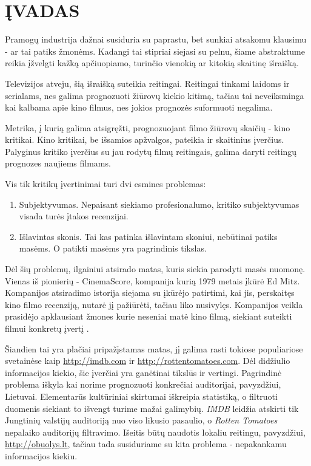 \chapter{ĮVADAS}

Pramogų industrija dažnai susiduria su paprastu, bet sunkiai atsakomu klausimu
- ar tai patiks žmonėms. Kadangi tai stipriai siejasi su pelnu, šiame abstraktume
reikia įžvelgti kažką apčiuopiamo, turinčio vienokią ar kitokią skaitinę išraišką.

Televizijos atveju, šią išraišką suteikia reitingai. Reitingai tinkami laidoms
ir serialams, nes galima prognozuoti žiūrovų kiekio kitimą, tačiau tai neveiksminga
kai kalbama apie kino filmus, nes jokios prognozės suformuoti negalima.

Metrika, į kurią galima atsigręžti, prognozuojant filmo žiūrovų skaičių - kino kritikai.
Kino kritikai, be išsamios apžvalgos, pateikia ir skaitinius įverčius. Palyginus
kritiko įverčius su jau rodytų filmų reitingais, galima daryti reitingų prognozes
naujiems filmams.

Vis tik kritikų įvertinimai turi dvi esmines problemas:
\begin{enumerate}
  \item Subjektyvumas. Nepaisant siekiamo profesionalumo, kritiko subjektyvumas
  visada turės įtakos recenzijai.
  \item Išlavintas skonis. Tai kas patinka išlavintam skoniui, nebūtinai patiks masėms.
  O patikti masėms yra pagrindinis tikslas.
\end{enumerate}

Dėl šių problemų, ilgainiui atsirado matas, kuris siekia parodyti masės nuomonę.
Vienas iš pionierių - CinemaScore, kompanija kurią 1979 metais įkūrė Ed Mitz.
Kompanijos atsiradimo istorija siejama su įkūrėjo patirtimi, kai jis, perskaitęs
kino filmo recenziją, nutarė jį pažiūrėti, tačiau liko nusivylęs. Kompanijos veikla
prasidėjo apklausiant žmones kurie neseniai matė kino filmą, siekiant suteikti filmui
konkretų įvertį \cite{cinema_score}.

Šiandien tai yra plačiai pripažįstamas matas, jį galima rasti tokiose populiariose svetainėse kaip
\url{http://imdb.com} ir \url{http://rottentomatoes.com}. Dėl didžiulio informacijos kiekio,
šie įverčiai yra ganėtinai tikslūs ir vertingi. Pagrindinė problema iškyla kai norime
prognozuoti konkrečiai auditorijai, pavyzdžiui, Lietuvai. Elementarūs kultūriniai
skirtumai iškreipia statistiką, o filtruoti duomenis siekiant to išvengt turime mažai galimybių.
\textit{IMDB} leidžia atskirti tik Jungtinių valstijų auditoriją nuo viso likusio pasaulio,
o \textit{Rotten Tomatoes} nepalaiko auditorijų filtravimo. Išeitis būtų naudotis
lokaliu reitingu, pavyzdžiui, \url{http://obuolys.lt}, tačiau tada susiduriame su kita problema
- nepakankamu informacijos kiekiu.

